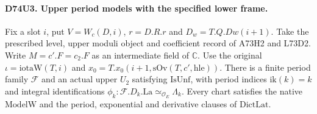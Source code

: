 \paragraph{D74U3. Upper period models with the specified lower frame.}
\label{claim:D74U3}
Fix a slot $i$, put $V=W_c(D,i)$, $r=D.R.r$ and $D_w=T.Q.Dw(i+1)$.
Take the prescribed level, upper moduli object and coefficient record
of A73H2 and L73D2. Write $M=c'.F=c_2.F$ as an intermediate field
of $\mathbb C$. Use the original $\iota=\mathrm{iotaW}(T,i)$ and
$x_0=T.x_0(i+1,\mathrm{sOv}(T,c',\mathrm{hle}))$. There is a finite
period family $\mathcal F$ and an actual upper $U_2$ satisfying
$\mathrm{IsUnf}$, with period indices $\mathrm{ik}(k)=k$ and
integral identifications
$\phi_k:\mathcal F.D_k.\mathrm{La}\simeq_{\mathcal O_E}\Lambda_k$.
Every chart satisfies the native $\mathrm{ModelW}$ and the
period, exponential and derivative clauses of $\mathrm{DictLat}$.


